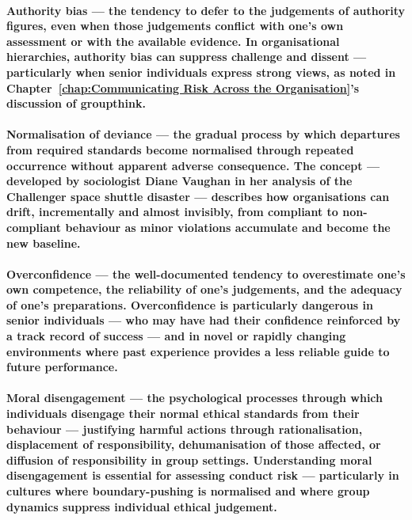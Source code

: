 \paragraph{\textbf{Authority bias} — the tendency to defer to the judgements of authority figures, even when those judgements conflict with one's own assessment or with the available evidence. In organisational hierarchies, authority bias can suppress challenge and dissent — particularly when senior individuals express strong views, as noted in Chapter~\ref{chap:Communicating Risk Across the Organisation}'s discussion of groupthink.}
\paragraph{\textbf{Normalisation of deviance} — the gradual process by which departures from required standards become normalised through repeated occurrence without apparent adverse consequence. The concept — developed by sociologist Diane Vaughan in her analysis of the Challenger space shuttle disaster — describes how organisations can drift, incrementally and almost invisibly, from compliant to non-compliant behaviour as minor violations accumulate and become the new baseline.}
\paragraph{\textbf{Overconfidence} — the well-documented tendency to overestimate one's own competence, the reliability of one's judgements, and the adequacy of one's preparations. Overconfidence is particularly dangerous in senior individuals — who may have had their confidence reinforced by a track record of success — and in novel or rapidly changing environments where past experience provides a less reliable guide to future performance.}
\paragraph{\textbf{Moral disengagement} — the psychological processes through which individuals disengage their normal ethical standards from their behaviour — justifying harmful actions through rationalisation, displacement of responsibility, dehumanisation of those affected, or diffusion of responsibility in group settings. Understanding moral disengagement is essential for assessing conduct risk — particularly in cultures where boundary-pushing is normalised and where group dynamics suppress individual ethical judgement.}

